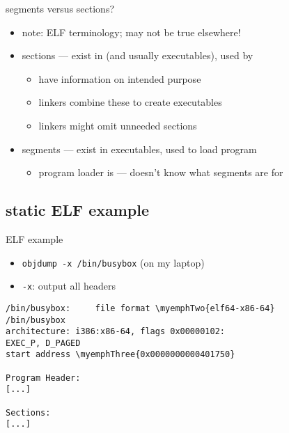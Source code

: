\begin{frame}{segments versus sections?}
\begin{itemize}
    \item note: ELF terminology; may not be true elsewhere!
    \item sections --- exist in  (and usually executables), used by 
        \begin{itemize}
        \item have information on intended purpose
        \item linkers combine these to create executables
        \item linkers might omit unneeded sections
        \end{itemize}
    \item segments --- exist in executables, used to load program
        \begin{itemize}
        \item program loader is  --- doesn't know what segments are for
        \end{itemize}
\end{itemize}
\end{frame}

\subsection{static ELF example}
\newcommand{\myemphTwo}[1]{\myemph<2>{#1}}
\newcommand{\myemphThree}[1]{\myemph<3>{#1}}
\newcommand{\myemphFour}[1]{\myemph<4>{#1}}
\newcommand{\myemphFive}[1]{\myemph<5>{#1}}
\newcommand{\myemphSix}[1]{\myemph<6>{#1}}
\newcommand{\myemphSeven}[1]{\myemph<7>{#1}}

\begin{frame}[fragile,label=elfExOver1]{ELF example}
    \begin{itemize}
    \item {\tt objdump -x /bin/busybox} (on my laptop)
    \item {\tt -x}: output all headers
    \end{itemize}
\begin{Verbatim}[commandchars=\\\{\},fontsize=\small]
/bin/busybox:     file format \myemphTwo{elf64-x86-64}
/bin/busybox
architecture: i386:x86-64, flags 0x00000102:
EXEC_P, D_PAGED
start address \myemphThree{0x0000000000401750}

Program Header:
[...]

Sections:
[...]
\end{Verbatim}
\end{frame}

